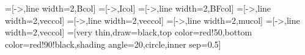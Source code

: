 \tikzset{>=latex} %
\usetikzlibrary{angles,quotes} %
=[->,line width=2,Bcol]
=[->,Icol] %
=[->,line width=2,BFcol]
=[->,line width=2,veccol]
=[->,line width=2,veccol]
=[->,line width=2,mucol]
=[->,line width=2,veccol]
=[very thin,draw=black,top color=red!50,bottom color=red!90!black,shading angle=20,circle,inner sep=0.5]

